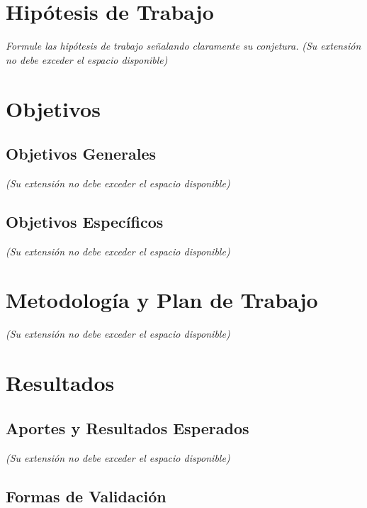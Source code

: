 \documentclass[11pt,spanish]{article}
\begin{document}
 
 

 

\section{Hipótesis de Trabajo}

\emph{Formule las hipótesis de trabajo señalando claramente su conjetura.}
\emph{(Su extensión no debe exceder el espacio disponible) }
 
 

\section{Objetivos }

\subsection{Objetivos Generales}

\emph{(Su extensión no debe exceder el espacio disponible)}

\subsection{Objetivos Específicos}

\emph{(Su extensión no debe exceder el espacio disponible) }
       

 

\section{Metodología y Plan de Trabajo}

\emph{(Su extensión no debe exceder el espacio disponible)}

 
\section{Resultados}

\subsection{Aportes y Resultados Esperados}

\emph{(Su extensión no debe exceder el espacio disponible)}
 

\subsection{Formas de Validación}
\end{document}
